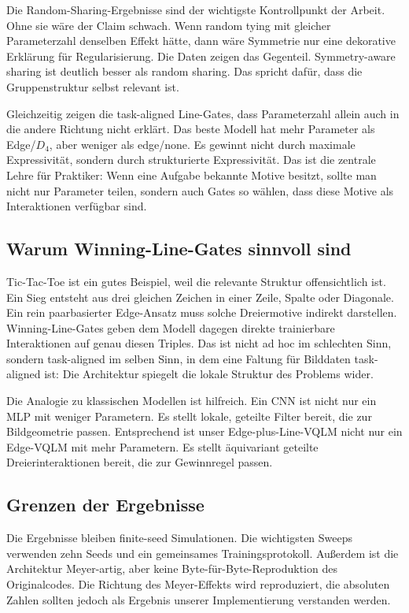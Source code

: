 Die Random-Sharing-Ergebnisse sind der wichtigste Kontrollpunkt der Arbeit. Ohne sie wäre der Claim schwach. Wenn random tying mit gleicher Parameterzahl denselben Effekt hätte, dann wäre Symmetrie nur eine dekorative Erklärung für Regularisierung. Die Daten zeigen das Gegenteil. Symmetry-aware sharing ist deutlich besser als random sharing. Das spricht dafür, dass die Gruppenstruktur selbst relevant ist.

Gleichzeitig zeigen die task-aligned Line-Gates, dass Parameterzahl allein auch in die andere Richtung nicht erklärt. Das beste Modell hat mehr Parameter als Edge/$D_4$, aber weniger als edge/none. Es gewinnt nicht durch maximale Expressivität, sondern durch strukturierte Expressivität. Das ist die zentrale Lehre für Praktiker: Wenn eine Aufgabe bekannte Motive besitzt, sollte man nicht nur Parameter teilen, sondern auch Gates so wählen, dass diese Motive als Interaktionen verfügbar sind.

\subsection{Warum Winning-Line-Gates sinnvoll sind}\label{subsec:whyline}

Tic-Tac-Toe ist ein gutes Beispiel, weil die relevante Struktur offensichtlich ist. Ein Sieg entsteht aus drei gleichen Zeichen in einer Zeile, Spalte oder Diagonale. Ein rein paarbasierter Edge-Ansatz muss solche Dreiermotive indirekt darstellen. Winning-Line-Gates geben dem Modell dagegen direkte trainierbare Interaktionen auf genau diesen Triples. Das ist nicht ad hoc im schlechten Sinn, sondern task-aligned im selben Sinn, in dem eine Faltung für Bilddaten task-aligned ist: Die Architektur spiegelt die lokale Struktur des Problems wider.

Die Analogie zu klassischen Modellen ist hilfreich. Ein CNN ist nicht nur ein MLP mit weniger Parametern. Es stellt lokale, geteilte Filter bereit, die zur Bildgeometrie passen. Entsprechend ist unser Edge-plus-Line-VQLM nicht nur ein Edge-VQLM mit mehr Parametern. Es stellt äquivariant geteilte Dreierinteraktionen bereit, die zur Gewinnregel passen.

\subsection{Grenzen der Ergebnisse}\label{subsec:limits}

Die Ergebnisse bleiben finite-seed Simulationen. Die wichtigsten Sweeps verwenden zehn Seeds und ein gemeinsames Trainingsprotokoll. Außerdem ist die Architektur Meyer-artig, aber keine Byte-für-Byte-Reproduktion des Originalcodes. Die Richtung des Meyer-Effekts wird reproduziert, die absoluten Zahlen sollten jedoch als Ergebnis unserer Implementierung verstanden werden.

